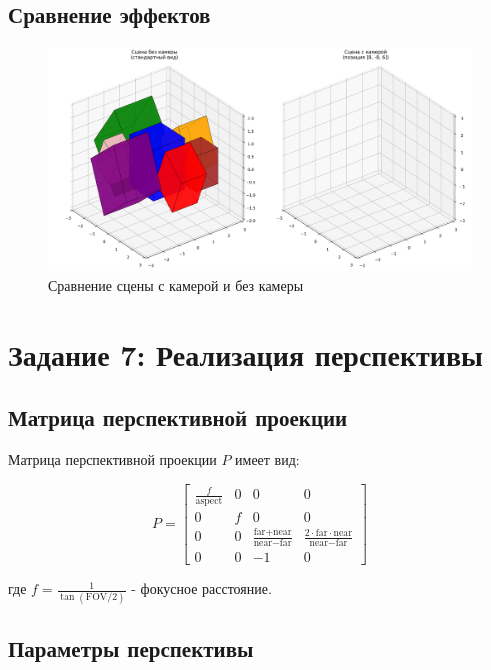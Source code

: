 \subsection*{Сравнение эффектов}

\begin{figure}[h]
\centering
\includegraphics[width=\textwidth]{images/task6/camera_effect_comparison.png}
\caption{Сравнение сцены с камерой и без камеры}
\label{fig:camera_effect_comparison}
\end{figure}

\section*{Задание 7: Реализация перспективы}

\subsection*{Матрица перспективной проекции}

Матрица перспективной проекции $P$ имеет вид:

\begin{equation}
P = \begin{bmatrix}
\frac{f}{\text{aspect}} & 0 & 0 & 0 \\
0 & f & 0 & 0 \\
0 & 0 & \frac{\text{far} + \text{near}}{\text{near} - \text{far}} & \frac{2 \cdot \text{far} \cdot \text{near}}{\text{near} - \text{far}} \\
0 & 0 & -1 & 0
\end{bmatrix}
\end{equation}

где $f = \frac{1}{\tan(\text{FOV}/2)}$ - фокусное расстояние.

\subsection*{Параметры перспективы}

